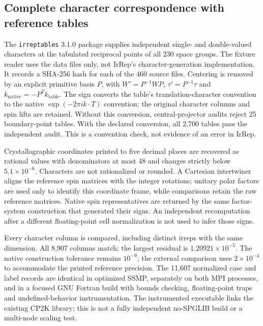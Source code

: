 \documentclass[11pt]{article}
\begin{document}
\subsection{Complete character correspondence with reference tables}
The \texttt{irreptables} 3.1.0 package supplies independent single-
and double-valued characters at the tabulated reciprocal points of
all 230 space groups. The fixture reader uses the data files only,
not IrRep's character-generation implementation. It records a SHA-256
hash for each of the 460 source files. Centering is removed by an
explicit primitive basis $P$, with
$W'=P^{-1}WP$, $\tau'=P^{-1}\tau$ and
$k_{\mathrm{native}}=-P^Tk_{\mathrm{table}}$.
The sign converts the table's translation-character convention to
the native $\exp(-2\pi i k\cdot T)$ convention; the original character
columns and spin lifts are retained. Without this conversion,
central-projector audits reject 25 boundary-point tables. With the
declared conversion, all 2,700 tables pass the independent audit.
This is a convention check, not evidence of an error in IrRep.

Crystallographic coordinates printed to five decimal places are
recovered as rational values with denominators at most 48 and changes
strictly below $5.1\times10^{-6}$. Characters are not rationalized or
rounded. A Cartesian intertwiner aligns the reference spin matrices
with the integer rotations; unitary polar factors are used only to
identify this coordinate frame, while comparisons retain the raw
reference matrices. Native spin representatives are returned by the
same factor-system construction that generated their signs. An
independent recomputation after a different floating-point cell
normalization is not used to infer those signs.

Every character column is compared, including distinct irreps with
the same dimension. All 8,907 columns match; the largest residual is
$1.20921\times10^{-5}$. The native construction tolerance remains
$10^{-9}$; the external comparison uses $2\times10^{-4}$ to accommodate
the printed reference precision. The 11,607 normalized case and label
records are identical in optimized SSMP, separately on both MPI
processes, and in a focused GNU Fortran build with bounds checking,
floating-point traps and undefined-behavior instrumentation. The
instrumented executable links the existing CP2K library; this is not
a fully independent no-SPGLIB build or a multi-node scaling test.
\end{document}
